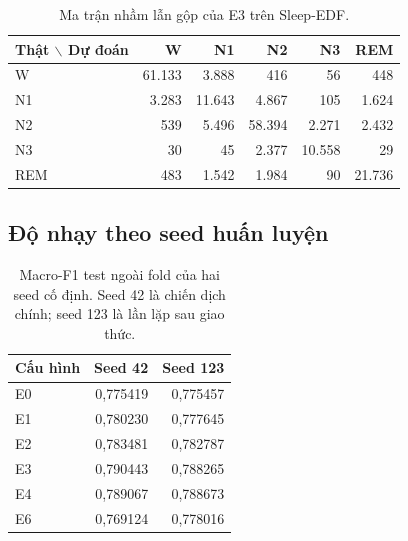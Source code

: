 \documentclass[10pt,a4paper]{article}
\begin{document}
\begin{table}[t]
\centering
\caption{Ma trận nhầm lẫn gộp của E3 trên Sleep-EDF.}
\label{tab:sleepedf-confusion}
\scriptsize
\begin{tabular}{lrrrrr}
\toprule
\textbf{Thật $\backslash$ Dự đoán} & \textbf{W} & \textbf{N1} & \textbf{N2} & \textbf{N3} & \textbf{REM} \\
\midrule
W & 61.133 & 3.888 & 416 & 56 & 448 \\
N1 & 3.283 & 11.643 & 4.867 & 105 & 1.624 \\
N2 & 539 & 5.496 & 58.394 & 2.271 & 2.432 \\
N3 & 30 & 45 & 2.377 & 10.558 & 29 \\
REM & 483 & 1.542 & 1.984 & 90 & 21.736 \\
\bottomrule
\end{tabular}
\end{table}

\subsection{Độ nhạy theo seed huấn luyện}

\begin{table}[t]
\centering
\caption{Macro-F1 test ngoài fold của hai seed cố định. Seed 42 là chiến dịch chính; seed 123 là lần lặp sau giao thức.}
\label{tab:multiseed-performance}
\small
\begin{tabular}{lrr}
\toprule
\textbf{Cấu hình} & \textbf{Seed 42} & \textbf{Seed 123} \\
\midrule
E0 & 0,775419 & 0,775457 \\
E1 & 0,780230 & 0,777645 \\
E2 & 0,783481 & 0,782787 \\
E3 & 0,790443 & 0,788265 \\
E4 & 0,789067 & 0,788673 \\
E6 & 0,769124 & 0,778016 \\
\bottomrule
\end{tabular}
\end{table}

\begin{table}[t]
\centering
\caption{Độ nhạy của bốn đối chiếu chính. Mỗi p-value được hiệu chỉnh Holm trong seed tương ứng; không có kiểm định gộp hai seed.}
\label{tab:multiseed-effects}
\small
{}
\end{table}
\end{document}
